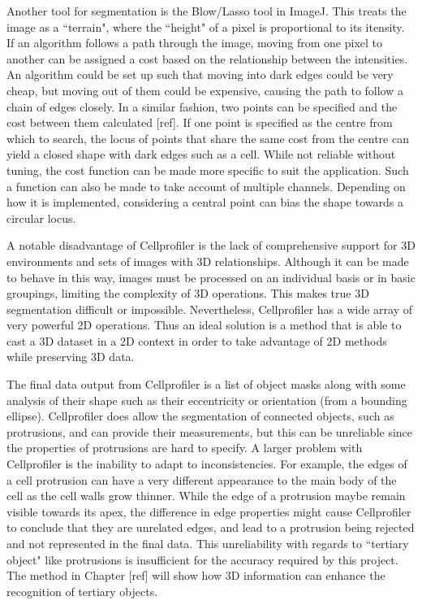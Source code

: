 Another tool for segmentation is the Blow/Lasso tool in ImageJ. This treats the image as a ``terrain", where the ``height" of a pixel is proportional to its itensity. If an algorithm follows a path through the image, moving from one pixel to another can be assigned a cost based on the relationship between the intensities. An algorithm could be set up such that moving into dark edges could be very cheap, but moving out of them could be expensive, causing the path to follow a chain of edges closely. In a similar fashion, two points can be specified and the cost between them calculated [ref]. If one point is specified as the centre from which to search, the locus of points that share the same cost from the centre can yield a closed shape with dark edges such as a cell. While not reliable without tuning, the cost function can be made more specific to suit the application. Such a function can also be made to take account of multiple channels. Depending on how it is implemented, considering a central point can bias the shape towards a circular locus.

A notable disadvantage of Cellprofiler is the lack of comprehensive support for 3D environments and sets of images with 3D relationships. Although it can be made to behave in this way, images must be processed on an individual basis or in basic groupings, limiting the complexity of 3D operations. This makes true 3D segmentation difficult or impossible. Nevertheless, Cellprofiler has a wide array of very powerful 2D operations. Thus an ideal solution is a method that is able to cast a 3D dataset in a 2D context in order to take advantage of 2D methods while preserving 3D data.

The final data output from Cellprofiler is a list of object masks along with some analysis of their shape such as their eccentricity or orientation (from a bounding ellipse). Cellprofiler does allow the segmentation of connected objects, such as protrusions, and can provide their measurements, but this can be unreliable since the properties of protrusions are hard to specify. A larger problem with Cellprofiler is the inability to adapt to inconsistencies. For example, the edges of a cell protrusion can have a very different appearance to the main body of the cell as the cell walls grow thinner. While the edge of a protrusion maybe remain visible towards its apex, the difference in edge properties might cause Cellprofiler to conclude that they are unrelated edges, and lead to a protrusion being rejected and not represented in the final data. This unreliability with regards to ``tertiary object" like protrusions is insufficient for the accuracy required by this project. The method in Chapter [ref] will show how 3D information can enhance the recognition of tertiary objects.

